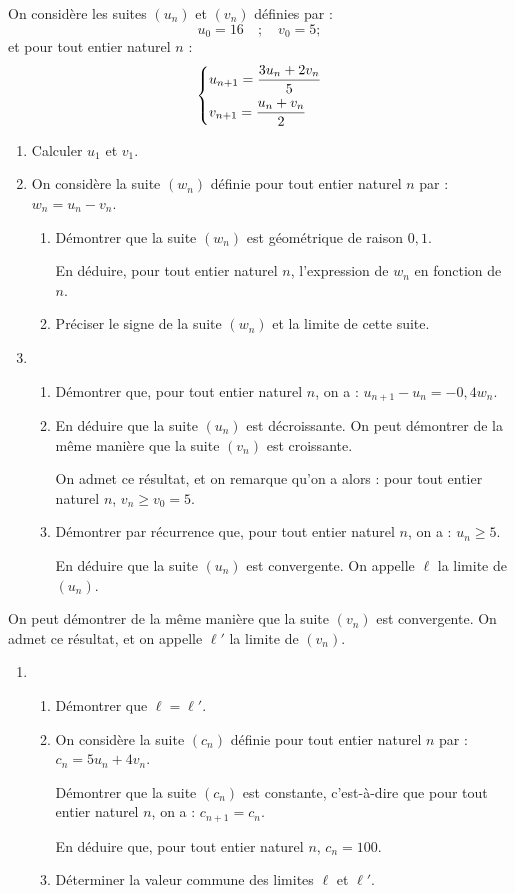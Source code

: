 On considère les suites $\left(u_n\right)$ et $\left(v_n\right)$ définies par : \[u_0 = 16 \quad ;\quad  v_0 = 5 ;\] et pour tout entier naturel $n$ :
%
\renewcommand\arraystretch{2}
\[\begin{dcases}
	u_{n+1}=\dfrac{3u_n + 2v_n}{5}\\
	v_{n+1}=\dfrac{u_n + v_n}{2}
\end{dcases}\]
\renewcommand\arraystretch{1}

\begin{enumerate}
	\item Calculer $u_1$ et $v_1$.
	\item On considère la suite $\left(w_n\right)$ définie pour tout entier naturel $n$ par : $w_n = u_n - v_n$.
	\begin{enumerate}
		\item Démontrer que la suite $\left(w_n\right)$ est géométrique de raison $0,1$.
		
		En déduire, pour tout entier naturel $n$, l'expression de $w_n$ en fonction de $n$.
		\item Préciser le signe de la suite $\left(w_n\right)$  et la limite de cette suite.
	\end{enumerate}
	\item 
	\begin{enumerate}
		\item Démontrer que, pour tout entier naturel $n$, on a : $u_{n+1} - u_n = - 0,4 w_n$.
		\item En déduire que la suite $\left(u_n\right)$ est décroissante.
		On peut démontrer de la même manière que la suite $\left(v_n\right)$ est croissante.
		
		On admet ce résultat, et on remarque qu'on a alors : pour tout entier naturel $n$, $v_n \geqslant v_0 = 5$.
		\item Démontrer par récurrence que, pour tout entier naturel $n$, on a : $u_n \geqslant 5$. 
		
		En déduire que la suite $\left(u_n\right)$ est convergente. On appelle $\ell$ la limite de $\left(u_n\right)$.
	\end{enumerate}
\end{enumerate}
%
On peut démontrer de la même manière que la suite $\left(v_n\right)$ est convergente. On admet ce résultat, et on appelle $\ell'$ la limite de $\left(v_n\right)$.
%
\begin{enumerate}[resume]
	\item 
	\begin{enumerate}
		\item Démontrer que $\ell = \ell'$.
		\item On considère la suite $\left(c_n\right)$ définie pour tout entier naturel $n$ par : $c_n = 5u_n + 4v_n$.
		
		Démontrer que la suite $\left(c_n\right)$ est constante, c'est-à-dire que pour tout entier naturel $n$, on a : $c_{n+1} = c_n$. 
		
		En déduire que, pour tout entier naturel $n$, $c_n = 100$.
		\item Déterminer la valeur commune des limites  $\ell$ et $\ell'$.
	\end{enumerate}
\end{enumerate}

